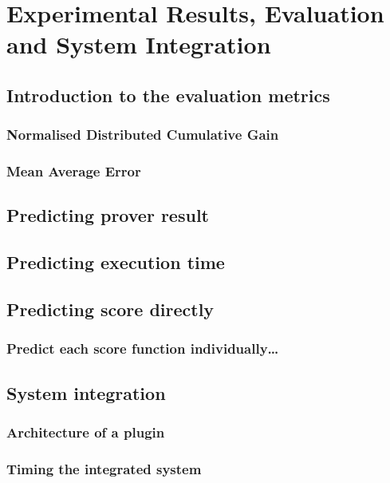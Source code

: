 \chapter{Experimental Results, Evaluation and System Integration}%

\label{Results} %

\section{Introduction to the evaluation metrics}
\subsection{Normalised Distributed Cumulative Gain}
\subsection{Mean Average Error}
\section{Predicting prover result}
\section{Predicting execution time}
\section{Predicting score directly}
\subsection{Predict each score function individually\dots}
\section{System integration}
\subsection{Architecture of a \why{} plugin}
\subsection{Timing the integrated system}
